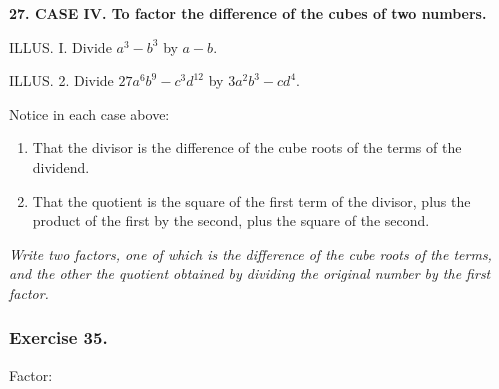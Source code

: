 \documentclass{book}
\begin{document}
\textbf{27. CASE IV. To factor the difference of the
cubes of two numbers.}

ILLUS. I. Divide $a^3-b^3$ by $a-b$.

ILLUS. 2. Divide $27a^6b^9 - c^3d^12$ by $3a^2b^3 - cd^4$.

Notice in each case above:

\begin{enumerate}
\item That the divisor is the difference of the cube roots of the
terms of the dividend.

\item That the quotient is the square of the first term of the
divisor, plus the product of the first by the second, plus the
square of the second.
\end{enumerate}

\textit{Write two factors, one of which is the difference
of the cube roots of the terms, and the other the
quotient obtained by dividing the original number
by the first factor.}

\subsubsection*{Exercise 35.}

Factor:
\end{document}

